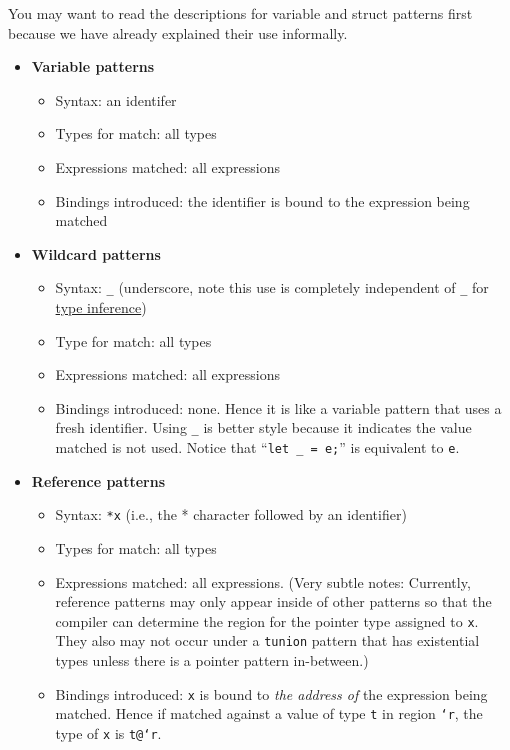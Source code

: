 You may want to read the descriptions for variable and struct patterns
first because we have already explained their use informally.

\begin{itemize}
\item \textbf{Variable patterns}
  \begin{itemize}
  \item Syntax: an identifer
  \item Types for match: all types
  \item Expressions matched: all expressions
  \item Bindings introduced: the identifier is bound to the expression
    being matched
  \end{itemize}
\item \hypertarget{wild_pat}{\textbf{Wildcard patterns}}
  \begin{itemize}
  \item Syntax: \texttt{_} (underscore, note this use is completely
    independent of \texttt{_} for \hyperlink{type_inference_sec}{type
      inference})
  \item Type for match: all types
  \item Expressions matched: all expressions
  \item Bindings introduced: none.  Hence it is like a
      variable pattern that uses a fresh identifier.  Using \texttt{_}
      is better style because it indicates the value matched is not
      used.  Notice that ``\texttt{let _ = e;}'' is equivalent to
      \texttt{e}.
  \end{itemize}
  
\item \textbf{Reference patterns}
  \begin{itemize}
  \item Syntax: \texttt{*x} (i.e., the * character followed by an
    identifier)
  \item Types for match: all types
  \item Expressions matched: all expressions.  (Very subtle notes: Currently,
    reference patterns may only appear inside of other patterns so
    that the compiler can determine the region for the pointer type
    assigned to \texttt{x}.  They also may not occur under a
  \texttt{tunion} pattern that has existential types unless there is a
  pointer pattern in-between.)
  \item Bindings introduced: \texttt{x} is bound to \emph{the address of}
    the expression being matched.  Hence if matched against a value
    of type \texttt{t} in region \texttt{`r}, the type of \texttt{x} is
    \texttt{t@`r}. 
  \end{itemize}
  

\end{itemize}
